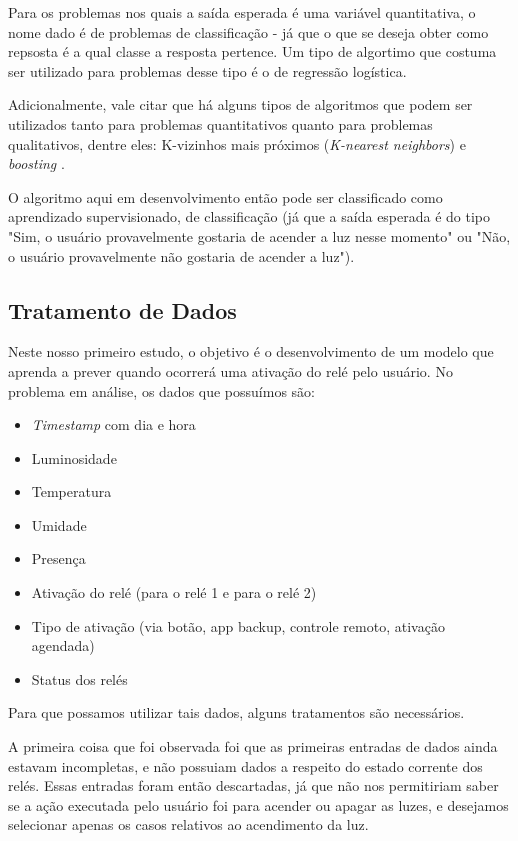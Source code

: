			Para os problemas nos quais a saída esperada é uma variável quantitativa, o nome dado é de problemas de classificação - já que o que se deseja obter como repsosta é a qual classe a resposta pertence. Um tipo de algortimo que costuma ser utilizado para problemas desse tipo é o de regressão logística.

			Adicionalmente, vale citar que há alguns tipos de algoritmos que podem ser utilizados tanto para problemas quantitativos quanto para problemas qualitativos, dentre eles: K-vizinhos mais próximos (\emph{K-nearest neighbors}) e \emph{boosting} \cite{islr}.

			O algoritmo aqui em desenvolvimento então pode ser classificado como aprendizado supervisionado, de classificação (já que a saída esperada é do tipo "Sim, o usuário provavelmente gostaria de acender a luz nesse momento" ou "Não, o usuário provavelmente não gostaria de acender a luz").

		\subsection{Tratamento de Dados}
			
			Neste nosso primeiro estudo, o objetivo é o desenvolvimento de um modelo que aprenda a prever quando ocorrerá uma ativação do relé pelo usuário. No problema em análise, os dados que possuímos são:

			\begin{itemize}
				\item \emph{Timestamp} com dia e hora
				\item Luminosidade
				\item Temperatura
				\item Umidade
				\item Presença
				\item Ativação do relé (para o relé 1 e para o relé 2)
				\item Tipo de ativação (via botão, app backup, controle remoto, ativação agendada)
				\item Status dos relés
			\end{itemize}

			Para que possamos utilizar tais dados, alguns tratamentos são necessários.

			A primeira coisa que foi observada foi que as primeiras entradas de dados ainda estavam incompletas, e não possuiam dados a respeito do estado corrente dos relés. Essas entradas foram então descartadas, já que não nos permitiriam saber se a ação executada pelo usuário foi para acender ou apagar as luzes, e desejamos selecionar apenas os casos relativos ao acendimento da luz.

